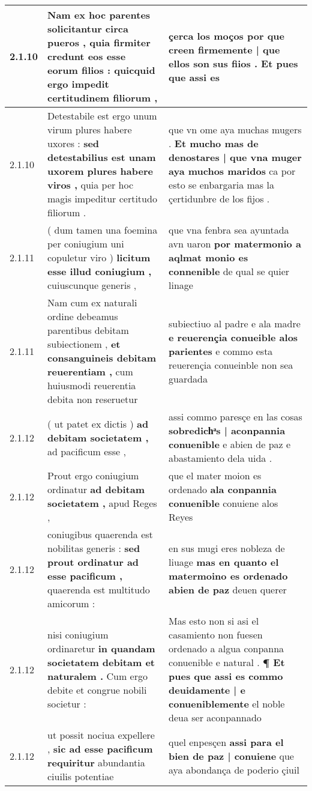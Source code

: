 \begin{tabular}{|p{1cm}|p{6.5cm}|p{6.5cm}|}
2.1.10 & Nam ex hoc parentes solicitantur circa pueros , \textbf{ quia firmiter credunt eos esse eorum filios : } quicquid ergo impedit certitudinem filiorum , & çerca los moços \textbf{ por que creen firmemente | que ellos son sus fiios . } Et pues que assi es \\\hline
2.1.10 & Detestabile est ergo unum virum plures habere uxores : \textbf{ sed detestabilius est unam uxorem plures habere viros , } quia per hoc magis impeditur certitudo filiorum . & que vn ome aya muchas mugers . \textbf{ Et mucho mas de denostares | que vna muger aya muchos maridos } ca por esto se enbargaria mas la çertidunbre de los fijos . \\\hline
2.1.11 & ( dum tamen una foemina per coniugium uni copuletur viro ) \textbf{ licitum esse illud coniugium , } cuiuscunque generis , & que vna fenbra sea ayuntada avn uaron \textbf{ por matermonio a aqlmat monio es connenible } de qual se quier linage \\\hline
2.1.11 & Nam cum ex naturali ordine debeamus parentibus debitam subiectionem , \textbf{ et consanguineis debitam reuerentiam , } cum huiusmodi reuerentia debita non reseruetur & subiectiuo al padre e ala madre \textbf{ e reuerençia conueible alos parientes } e commo esta reuerençia conueinble non sea guardada \\\hline
2.1.12 & ( ut patet ex dictis ) \textbf{ ad debitam societatem , } ad pacificum esse , & assi commo paresçe en las cosas \textbf{ sobredichͣs | aconpannia conuenible } e abien de paz e abastamiento dela uida . \\\hline
2.1.12 & Prout ergo coniugium ordinatur \textbf{ ad debitam societatem , } apud Reges , & que el mater moion es ordenado \textbf{ ala conpannia conuenible } conuiene alos Reyes \\\hline
2.1.12 & coniugibus quaerenda est nobilitas generis : \textbf{ sed prout ordinatur ad esse pacificum , } quaerenda est multitudo amicorum : & en sus mugi eres nobleza de liuage \textbf{ mas en quanto el matermoino es ordenado abien de paz } deuen querer \\\hline
2.1.12 & nisi coniugium ordinaretur \textbf{ in quandam societatem debitam et naturalem . } Cum ergo debite et congrue nobili societur : & Mas esto non si asi el casamiento non fuesen ordenado a algua conpanna conuenible e natural . \textbf{ ¶ Et pues que assi es commo deuidamente | e conueniblemente } el noble deua ser aconpannado \\\hline
2.1.12 & ut possit nociua expellere , \textbf{ sic ad esse pacificum requiritur } abundantia ciuilis potentiae & quel enpesçen \textbf{ assi para el bien de paz | conuiene } que aya abondança de poderio çiuil \\\hline

\end{tabular}
